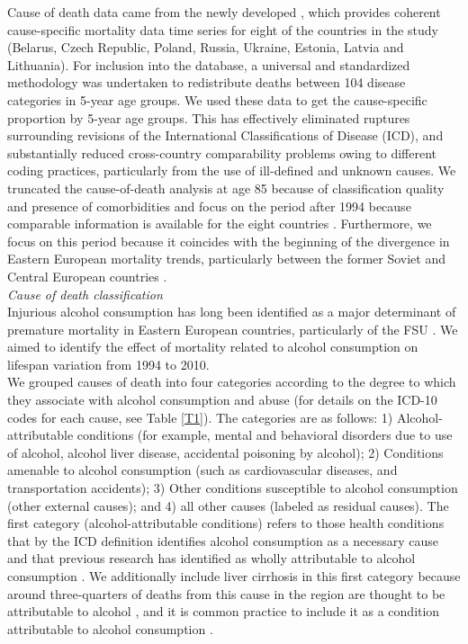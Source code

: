 \documentclass{article}
\begin{document}
\begin{spacing}{1.5}
Cause of death data came from the newly developed \citet{HcO}, which provides coherent cause-specific mortality data time series for eight of the countries in the study (Belarus, Czech Republic, Poland, Russia, Ukraine, Estonia, Latvia and Lithuania). For inclusion into the database, a universal and standardized methodology was undertaken to redistribute deaths between 104 disease categories in 5-year age groups. We used these data to get the cause-specific proportion by 5-year age groups. This has effectively eliminated ruptures surrounding revisions of the International Classifications of Disease (ICD), and substantially reduced cross-country comparability problems owing to different coding practices, particularly from the use of ill-defined and unknown causes. We truncated the cause-of-death analysis at age 85 because of classification quality and presence of comorbidities and focus on the period after 1994 because comparable information is available for the eight countries \citep{HcO}. Furthermore, we focus on this period because it coincides with the beginning of the divergence in Eastern European mortality trends, particularly between the former Soviet and Central European countries \citep{mesle2004mortality}.\\

\emph{Cause of death classification}\\

Injurious alcohol consumption has long been identified as a major determinant of premature mortality in Eastern European countries, \textcolor[rgb]{1,0,0}{particularly of the FSU} \citep{leon1997huge,mckee2001,rehm2007,grigoriev2015}. We aimed to identify the effect of mortality related to alcohol consumption on lifespan variation from 1994 to 2010. \\

We grouped causes of death into four categories according to the degree to which they associate with alcohol consumption and abuse (for details on the ICD-10 codes for each cause, see Table \ref{T1}). The categories are as follows:
1) Alcohol-attributable conditions (for example, mental and behavioral disorders due to use of alcohol, alcohol liver disease, accidental poisoning by alcohol); 2) Conditions amenable to alcohol consumption (such as cardiovascular diseases, and transportation accidents); 3) Other conditions susceptible to alcohol consumption (other external causes); and 4) all other causes (labeled as residual causes). 
The first category (alcohol-attributable conditions) refers to those health conditions that by the ICD definition identifies alcohol consumption as a necessary cause and that previous research has identified as wholly attributable to alcohol consumption \citep{rehm2010relation}. We additionally include liver cirrhosis in this first category because around three-quarters of deaths from this cause in the region are thought to be attributable to alcohol \citep{rehm2003relationship}, and it is common practice to include it as a condition attributable to alcohol consumption \citep{rehm2003relationship,rehm2010relation}. \\
	

\end{spacing}
\end{document}
